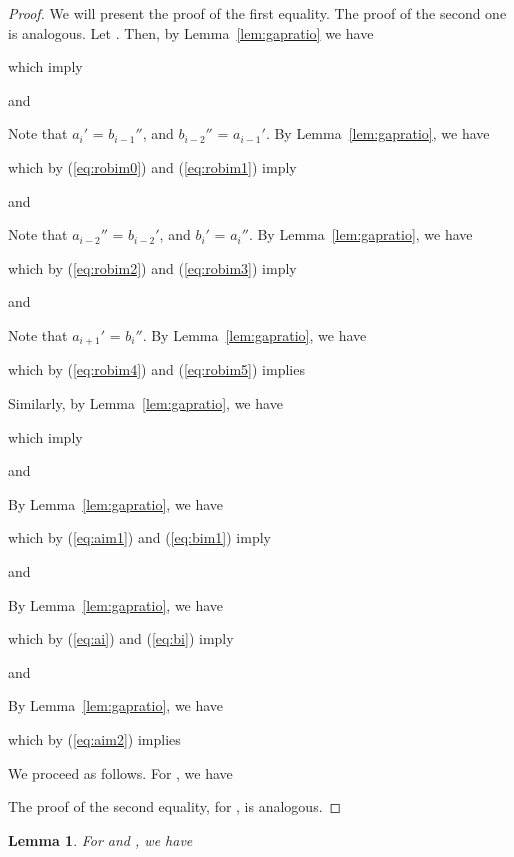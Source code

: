 \documentclass[11pt]{article}
\newcommand{\leftof}[1]{\ensuremath{\gap #1'}}
\newcommand{\rightof}[1]{\ensuremath{\gap #1''}}
\newcommand{\gap}[1]{\ensuremath{#1}}
\newcounter{count}
\newtheorem{lemma}[count]{Lemma}
\begin{document}
\begin{proof} 


We will present the proof of the first equality. The proof of the second one is analogous. Let . Then, by Lemma~\ref{lem:gapratio} we have 

 
which imply 
 
and 
 
Note that \leftof{a_i} = \rightof{b_{i-1}}, and \rightof{b_{i-2}} = \leftof{a_{i-1}}. By Lemma~\ref{lem:gapratio}, we have 

which by (\ref{eq:robim0}) and (\ref{eq:robim1}) imply 
 
and 
 
Note that \rightof{a_{i-2}} = \leftof{b_{i-2}}, and \leftof{b_{i}} = \rightof{a_{i}}. By Lemma~\ref{lem:gapratio}, we have 
 
which by (\ref{eq:robim2}) and (\ref{eq:robim3}) imply 
 
and 
 
Note that \leftof{a_{i+1}} = \rightof{b_{i}}. By Lemma~\ref{lem:gapratio}, we have 
 
which by (\ref{eq:robim4}) and (\ref{eq:robim5}) implies 
 
Similarly, by Lemma~\ref{lem:gapratio}, we have 
 
which imply 
 
and 
 
By Lemma~\ref{lem:gapratio}, we have 
 
which by (\ref{eq:aim1}) and (\ref{eq:bim1}) imply 
 
and 
 
By Lemma~\ref{lem:gapratio}, we have 
 
which by (\ref{eq:ai}) and (\ref{eq:bi}) imply 
 
and 
 
By Lemma~\ref{lem:gapratio}, we have 
 
which by (\ref{eq:aim2}) implies 
 


We proceed as follows. For , we have 
{\allowdisplaybreaks 
 
} 
The proof of the second equality,  for , is analogous. 

\end{proof} 



\begin{lemma} 
\label{lem:maxmappingbound} 
For  and , we have 
 
\end{lemma} 
\end{document}

